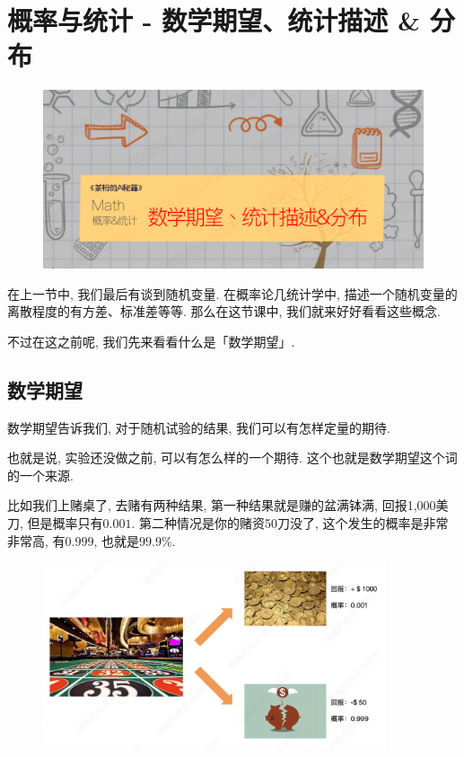 \chapter{概率与统计 - 数学期望、统计描述 \& 分布}

\begin{figure}[ht]
  \centering
  \includegraphics[width=1\textwidth]{asset/20230917201549.png}
\end{figure}
\newpage


在上一节中, 我们最后有谈到随机变量. 在概率论几统计学中, 描述一个随机变量的离散程度的有方差、标准差等等. 那么在这节课中, 我们就来好好看看这些概念. 

不过在这之前呢, 我们先来看看什么是「数学期望」. 

\section{数学期望}

数学期望告诉我们, 对于随机试验的结果, 我们可以有怎样定量的期待. 

也就是说, 实验还没做之前, 可以有怎么样的一个期待. 这个也就是数学期望这个词的一个来源. 

比如我们上赌桌了, 去赌有两种结果, 第一种结果就是赚的盆满钵满, 回报1,000美刀, 但是概率只有$0.001$. 第二种情况是你的赌资50刀没了, 这个发生的概率是非常非常高, 有$0.999$, 也就是$99.9\%$. 

\begin{figure}[ht]
  \centering
  \includegraphics[width=0.9\textwidth]{asset/20230826212939.png}
  \caption{}
  \label{fig:img22_1}
\end{figure}

